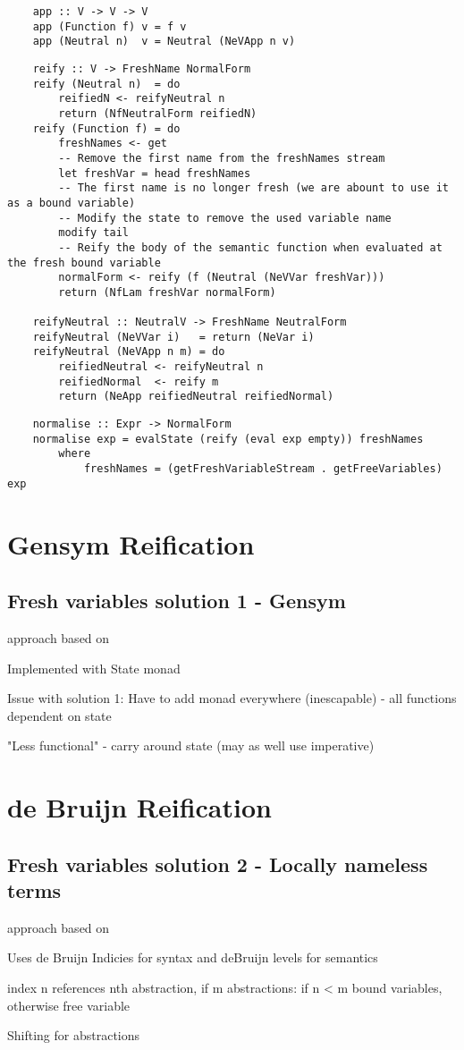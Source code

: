 \begin{lstlisting}
    app :: V -> V -> V
    app (Function f) v = f v
    app (Neutral n)  v = Neutral (NeVApp n v)
\end{lstlisting}


\begin{lstlisting}
    reify :: V -> FreshName NormalForm
    reify (Neutral n)  = do 
        reifiedN <- reifyNeutral n
        return (NfNeutralForm reifiedN)
    reify (Function f) = do
        freshNames <- get
        -- Remove the first name from the freshNames stream
        let freshVar = head freshNames
        -- The first name is no longer fresh (we are abount to use it as a bound variable)
        -- Modify the state to remove the used variable name
        modify tail
        -- Reify the body of the semantic function when evaluated at the fresh bound variable
        normalForm <- reify (f (Neutral (NeVVar freshVar)))
        return (NfLam freshVar normalForm)

    reifyNeutral :: NeutralV -> FreshName NeutralForm
    reifyNeutral (NeVVar i)   = return (NeVar i)
    reifyNeutral (NeVApp n m) = do
        reifiedNeutral <- reifyNeutral n
        reifiedNormal  <- reify m
        return (NeApp reifiedNeutral reifiedNormal)
\end{lstlisting}


\begin{lstlisting}
    normalise :: Expr -> NormalForm
    normalise exp = evalState (reify (eval exp empty)) freshNames 
        where
            freshNames = (getFreshVariableStream . getFreeVariables) exp
\end{lstlisting}

\section{Gensym Reification}

\subsection{Fresh variables solution 1 - Gensym}
approach based on \cite{slides}

Implemented with State monad

Issue with solution 1: Have to add monad everywhere (inescapable) - all functions dependent on state

"Less functional" - carry around state (may as well use imperative)
\section{de Bruijn Reification}
\subsection{Fresh variables solution 2 - Locally nameless terms}
approach based on \cite{deBruijn}

Uses de Bruijn Indicies for syntax and deBruijn levels for semantics

index n references nth abstraction,
if m abstractions: if n < m bound variables, otherwise free variable

Shifting for abstractions
